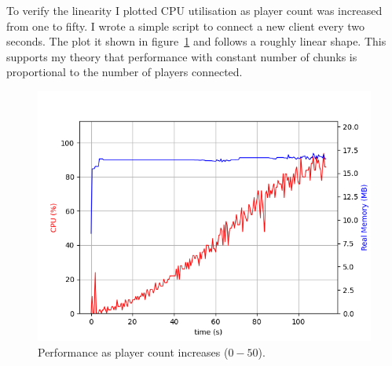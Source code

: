 \documentclass[12pt,notitlepage,a4paper]{report}
\begin{document}
	To verify the linearity I plotted CPU utilisation as player count was increased from one to fifty. I wrote a simple script to connect a new client every two seconds. The plot it shown in figure~\ref{fig:linear50} and follows a roughly linear shape. This supports my theory that performance with constant number of chunks is proportional to the number of players connected.
	\begin{figure}[!ht]
		\includegraphics[width=\textwidth]{linear.png}
		\caption{Performance as player count increases ($0-50$).}
		\label{fig:linear50}
	\end{figure}
\end{document}
